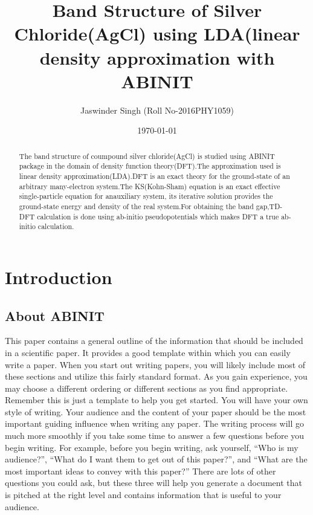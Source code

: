 \documentclass[preprint,pre,floats,aps,amsmath,amssymb]{revtex4}
\begin{document}
\title{Band Structure of Silver Chloride(AgCl) using LDA(linear density approximation with ABINIT}
\author{Jaswinder Singh (Roll No-2016PHY1059)}
\date{\today}

\begin{abstract}
The band structure of coumpound silver chloride(AgCl) is studied using ABINIT package in the domain of density function theory(DFT).The approximation used is linear density approximation(LDA).DFT is an exact theory for the ground-state of an arbitrary many-electron system.The KS(Kohn-Sham) equation is an exact effective single-particle equation for anauxiliary system, its iterative solution provides the ground-state energy and density of the real system.For obtaining the band gap,TD-DFT calculation is done using ab-initio pseudopotentials which makes DFT a true ab-initio calculation.
\end{abstract}

\maketitle

\section{Introduction}
\subsection{About ABINIT}

This paper contains a general outline of the information that should
be included in a scientific paper.  It provides a good template within
which you can easily write a paper.    When you start out writing
papers, you will likely include most of these sections and utilize
this fairly standard format. As you gain experience, you may choose a
different ordering or different sections as you find appropriate. 
Remember this is just a template to help you get started.  You will
have your own style of writing. Your audience and the content of your
paper should be the most important guiding influence when writing any
paper.  The writing process will go much more smoothly if you take
some time to answer a few questions before you begin writing. For
example, before you begin writing, ask yourself, ``Who is my
audience?'', ``What do I want them to get out of this paper?'', and
``What are the most important ideas to convey with this paper?'' 
There are lots of other questions you could ask, but these three will
help you generate a document that is pitched at the right level and
contains information that is useful to your audience.
\end{document}
